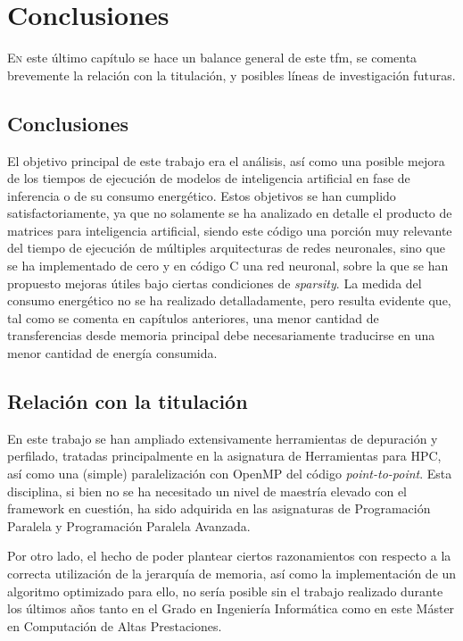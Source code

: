 \chapter{Conclusiones}
\label{chap:conclusiones}

\lettrine{E}{n} este último capítulo se hace un balance general de este \acrlong{tfm}, se comenta brevemente la relación con la titulación, y posibles líneas de investigación futuras.

\section{Conclusiones}
El objetivo principal de este trabajo era el análisis, así como una posible mejora de los tiempos de ejecución de modelos de inteligencia artificial en fase de inferencia o de su consumo energético. Estos objetivos se han cumplido satisfactoriamente, ya que no solamente se ha analizado en detalle el producto de matrices para inteligencia artificial, siendo este código una porción muy relevante del tiempo de ejecución de múltiples arquitecturas de redes neuronales, sino que se ha implementado de cero y en código C una red neuronal, sobre la que se han propuesto mejoras útiles bajo ciertas condiciones de \textit{sparsity}. La medida del consumo energético no se ha realizado detalladamente, pero resulta evidente que, tal como se comenta en capítulos anteriores, una menor cantidad de transferencias desde memoria principal debe necesariamente traducirse en una menor cantidad de energía consumida.

\section{Relación con la titulación}
En este trabajo se han ampliado extensivamente herramientas de depuración y perfilado, tratadas principalmente en la asignatura de Herramientas para HPC, así como una (simple) paralelización con OpenMP del código \textit{point-to-point}. Esta disciplina, si bien no se ha necesitado un nivel de maestría elevado con el framework en cuestión, ha sido adquirida en las asignaturas de Programación Paralela y Programación Paralela Avanzada.

Por otro lado, el hecho de poder plantear ciertos razonamientos con respecto a la correcta utilización de la jerarquía de memoria, así como la implementación de un algoritmo optimizado para ello, no sería posible sin el trabajo realizado durante los últimos años tanto en el Grado en Ingeniería Informática como en este Máster en Computación de Altas Prestaciones.

